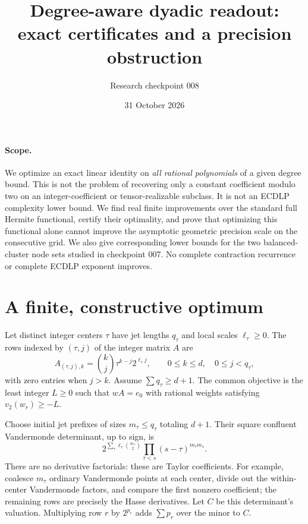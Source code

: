 \documentclass[11pt]{article}
\title{Degree-aware dyadic readout: exact certificates and a precision obstruction}
\author{Research checkpoint 008}
\date{31 October 2026}
\begin{document}
\maketitle

\paragraph{Scope.}
We optimize an exact linear identity on \emph{all rational polynomials}
of a given degree bound. This is not the problem of recovering only a
constant coefficient modulo two on an integer-coefficient or
tensor-realizable subclass. It is not an ECDLP complexity lower bound.
We find real finite improvements over the standard full Hermite
functional, certify their optimality, and prove that optimizing this
functional alone cannot improve the asymptotic geometric precision
scale on the consecutive grid. We also give corresponding lower bounds
for the two balanced-cluster node sets studied in checkpoint 007.
No complete contraction recurrence or complete ECDLP exponent improves.

\section{A finite, constructive optimum}
Let distinct integer centers $\tau$ have jet lengths $q_\tau$ and local
scales $\ell_\tau\ge0$. The rows indexed by $(\tau,j)$ of the integer
matrix $A$ are
\[
 A_{(\tau,j),k}=\binom{k}{j}\tau^{k-j}2^{\ell_\tau j},
 \qquad 0\le k\le d,\quad 0\le j<q_\tau,
\]
with zero entries when $j>k$. Assume $\sum q_\tau\ge d+1$.
The common objective is the least integer $L\ge0$ such that
$wA=e_0$ with rational weights satisfying $v_2(w_r)\ge-L$.

Choose initial jet prefixes of sizes $m_\tau\le q_\tau$ totaling $d+1$.
Their square confluent Vandermonde determinant, up to sign, is
\[
 2^{\sum_\tau\ell_\tau\binom{m_\tau}{2}}
 \prod_{\tau<s}(s-\tau)^{m_\tau m_s}.
\]
There are no derivative factorials: these are Taylor coefficients.
For example, coalesce $m_\tau$ ordinary Vandermonde points at each
center, divide out the within-center Vandermonde factors, and compare
the first nonzero coefficient; the remaining rows are precisely the
Hasse derivatives. Let $C$ be this determinant's valuation.
Multiplying row $r$ by $2^{p_r}$ adds $\sum p_r$ over the minor to $C$.
\end{document}
